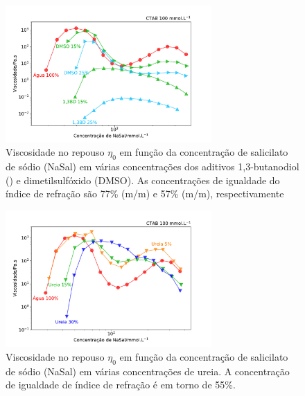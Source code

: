 			\begin{figure}[htb]
				\centering
				\includegraphics[width=0.7\textwidth]{imagens/reologia/RH_13BD_DMSO}
				\caption{Viscosidade no repouso \(\eta_0\) em função da concentração de salicilato de sódio (NaSal) em várias concentrações dos aditivos 1,3-butanodiol (\BD) e dimetilsulfóxido (DMSO). As concentrações de igualdade do índice de refração são 77\% (m/m) e 57\% (m/m), respectivamente}
				\label{fig:rh_13bd_dmso}
			\end{figure}  
			
			\begin{figure}[htb]
				\centering
				\includegraphics[width=0.7\textwidth]{imagens/reologia/RH_ureia}
				\caption{Viscosidade no repouso \(\eta_0\) em função da concentração de salicilato de sódio (NaSal) em várias concentrações de ureia. A concentração de igualdade de índice de refração é em torno de 55\%.}
				\label{fig:rh_ureia}
			\end{figure} 
			
